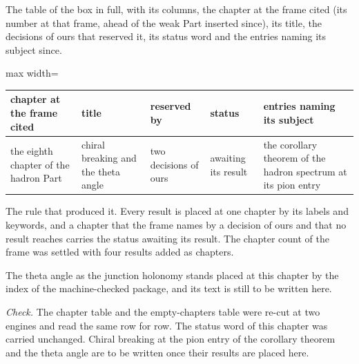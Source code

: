 \begin{chproof}[instrument]
The table of the box in full, with its columns, the chapter at the frame cited (its number at that frame, ahead of the weak Part inserted since), its title, the decisions of ours that reserved it, its status word and the entries naming its subject since.
\begin{center}\small
\begin{adjustbox}{max width=\linewidth}\begin{tabular}{lllll}
\hline
chapter at the frame cited & title & reserved by & status & entries naming its subject \\
\hline
the eighth chapter of the hadron Part & chiral breaking and the theta angle & two decisions of ours & awaiting its result & the corollary theorem of the hadron spectrum at its pion entry \\
\hline
\end{tabular}\end{adjustbox}
\end{center}
The rule that produced it. Every result is placed at one chapter by its labels and keywords, and a chapter that the frame names by a decision of ours and that no result reaches carries the status awaiting its result. The chapter count of the frame was settled with four results added as chapters.

The theta angle as the junction holonomy stands placed at this chapter by the index of the machine-checked package, and its text is still to be written here.

\emph{Check.} The chapter table and the empty-chapters table were re-cut at two engines and read the same row for row. The status word of this chapter was carried unchanged.
Chiral breaking at the pion entry of the corollary theorem and the theta angle are to be written once their results are placed here.
\end{chproof}
\label{chend:VII-8-chiral-breaking-and-the-theta-angle}

